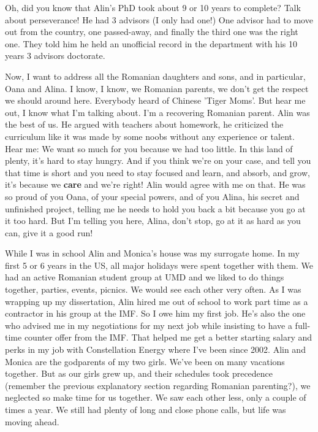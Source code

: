 \documentclass[12pt]{article}
\begin{document}
\bigskip
Oh, did you know that Alin's PhD took about 9 or 10 years to complete?  
Talk about perseverance!  He had 3 advisors (I only had one!)  One advisor 
had to move out from the country, one passed-away, and finally the third one 
was the right one.  They told him he held an unofficial record in the 
department with his 10 years 3 advisors doctorate.    

\bigskip
Now, I want to address all the Romanian daughters and sons, and in 
particular, Oana and Alina.  I know, I know, we Romanian parents, 
we don't get the respect we should around here.  Everybody heard of 
Chinese 'Tiger Moms'.  But hear me out, I know what I'm talking about.   
I'm a recovering Romanian parent. Alin was the best of us.  
He argued with teachers about homework, he criticized the curriculum 
like it was made by some noobs without any experience or talent.  
Hear me: We want so much for you because we had too 
little. In this land of plenty, it's hard to stay hungry.  
And if you think we're on your case, and tell you that time is short 
and you need to stay focused and learn, and absorb, and grow, 
it's because we {\bf care} and we're right!  Alin would agree with me 
on that.  He was so proud of you Oana, of your special powers, and of 
you Alina, his secret and unfinished project, telling me he needs to 
hold you back a bit because you go at it too hard.  But I'm telling 
you here, Alina, don't stop, go at it as hard as you can, give 
it a good run! 


\bigskip
While I was in school Alin and Monica's house was my surrogate home.  
In my first 5 or 6 years in the US, all major holidays were spent 
together with them.  We had an active Romanian student group at 
UMD and we liked to do things together, parties, events, picnics.  
We would see each other very often.  As I was wrapping up 
my dissertation, Alin hired me out of school to 
work part time as a contractor in his group at the IMF.  So I owe him 
my first job.  He's also the one who advised me in my negotiations 
for my next job while insisting to have a full-time counter offer 
from the IMF.  That helped me get a better starting salary and perks in 
my job with Constellation Energy where I've been since 2002.  
Alin and Monica are the godparents of my two girls.  We've been on 
many vacations together.  But as our girls grew up, and their schedules 
took precedence (remember the previous explanatory section regarding 
Romanian parenting?), we neglected so make time for us together.  
We saw each other less, only a couple of times a year.  We still 
had plenty of long and close phone calls, but life was moving ahead. 
\end{document}
